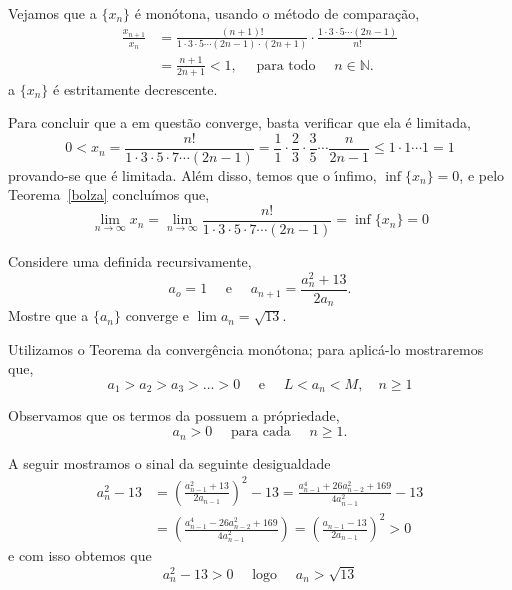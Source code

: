 \solo Vejamos que a \seq $\{x_n\}$ \'{e} mon\'{o}tona, usando o m\'{e}todo de compara\c{c}\~{a}o,
\begin{align*}
    \frac{x_{n+1}}{x_n}&=\frac{(n+1)!}{1\cdot 3\cdot 5\cdots (2n-1)\cdot(2n+1)}\cdot\frac{1\cdot 3\cdot 5\cdots (2n-1)}{n!}\\[2ex]
    &=\frac{n+1}{2n+1}<1,\quad \text{ para todo }\quad n\in \mathbb{N}.
\end{align*}
a \seq $\{x_n\}$ \'{e} estritamente decrescente.

Para concluir que a \seq em quest\~{a}o converge, basta verificar que ela \'{e} limitada,
\begin{equation*}
    0<x_n=\frac{n!}{1\cdot 3\cdot 5\cdot 7\cdots (2n-1) }=\frac{1}{1}\cdot\frac{2}{3}\cdot\frac{3}{5}\cdots\frac{n}{2n-1}\leq 1\cdot 1\cdots 1=1
\end{equation*}
provando-se que \'{e} limitada. Al\'{e}m disso, temos que o \'{\i}nfimo, $\inf\{x_n\}=0$, e pelo Teorema~\ref{bolza} concluímos que,
\begin{equation*}
    \lim_{n\to \infty}x_n=\lim_{n\to \infty}\frac{n!}{1\cdot 3\cdot 5\cdot 7\cdots (2n-1) }=\inf\{x_n\}=0
\end{equation*}


\begin{exer}
Considere uma \seq definida recursivamente,
\begin{equation*}
    a_o=1\quad \text{ e }\quad a_{n+1}=\frac{a_n^2+13}{2a_n}.
\end{equation*}
Mostre que a \seq $\{a_n\}$ converge e $\lim a_n=\sqrt{13}$.
\end{exer}

\solo Utilizamos o Teorema da converg\^{e}ncia mon\'{o}tona; para aplic\'{a}-lo
mostraremos que,
\begin{equation*}
    a_1>a_2>a_3>\ldots>0\quad\text{ e }\quad  L<a_n<M,\quad n\geq 1
\end{equation*}

Observamos que os termos da \seq possuem a pr\'{o}priedade,
\begin{equation*}
    a_n>0\quad\text{ para cada }\quad n\geq 1.
\end{equation*}

A seguir mostramos o sinal da seguinte desigualdade
\begin{align*}
    a_n^2-13&=\left(\frac{a^2_{n-1}+13}{2a_{n-1}}
    \right)^2-13=\frac{a^4_{n-1}+26a^2_{n-2}+169}{4a^2_{n-1}}-13\\[2ex]
    &=\left( \frac{a^4_{n-1}-26a^2_{n-2}+169}{4a^2_{n-1}} \right)=
    \left( \frac{a_{n-1}-13}{2a_{n-1}} \right)^2  >0
\end{align*}
e com isso obtemos que
\begin{equation}\label{mono-1}
    a^2_n-13>0\quad\text{ logo }\quad a_n>\sqrt{13}
\end{equation}

